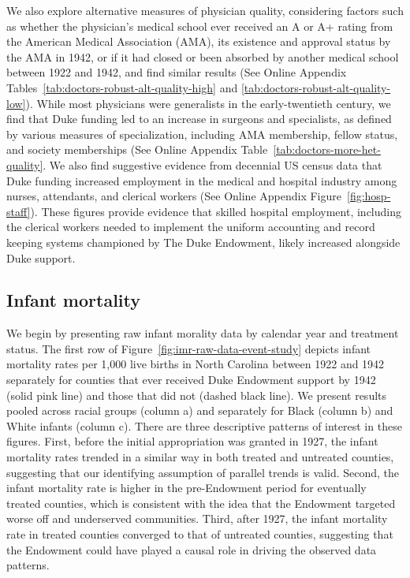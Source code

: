 \documentclass[12pt]{article}
\begin{document}
We also explore alternative measures of physician quality, considering factors such as whether the physician's medical school ever received an A or A+ rating from the American Medical Association (AMA), its existence and approval status by the AMA in 1942, or if it had closed or been absorbed by another medical school between 1922 and 1942, and find similar results (See Online Appendix Tables~\ref{tab:doctors-robust-alt-quality-high} and \ref{tab:doctors-robust-alt-quality-low}). 
While most physicians were generalists in the early-twentieth century, we find that Duke funding led to an increase in surgeons and specialists, as defined by various measures of specialization, including AMA membership, fellow status, and society memberships (See Online Appendix Table~\ref{tab:doctors-more-het-quality}. 
We also find suggestive evidence from decennial US census data that Duke funding increased employment in the medical and hospital industry among nurses, attendants, and clerical workers (See Online Appendix Figure~\ref{fig:hosp-staff}). 
These figures provide evidence that skilled hospital employment, including the clerical workers needed to implement the uniform accounting and record keeping systems championed by The Duke Endowment, likely increased alongside Duke support.


\subsection{Infant mortality}\label{subsec:infant-mortality}

We begin by presenting raw infant morality data by calendar year and treatment status. 
The first row of Figure~\ref{fig:imr-raw-data-event-study} depicts infant mortality rates per 1,000 live births in North Carolina between 1922 and 1942 separately for counties that ever received Duke Endowment support by 1942 (solid pink line) and those that did not (dashed black line). 
We present results pooled across racial groups (column a) and separately for Black (column b) and White infants (column c). 
There are three descriptive patterns of interest in these figures.
First, before the initial appropriation was granted in 1927, the infant mortality rates trended in a similar way in both treated and untreated counties, suggesting that our identifying assumption of parallel trends is valid.
Second, the infant mortality rate is higher in the pre-Endowment period for eventually treated counties, which is consistent with the idea that the Endowment targeted worse off and underserved communities.
Third, after 1927, the infant mortality rate in treated counties converged to that of untreated counties, suggesting that the Endowment could have played a causal role in driving the observed data patterns.
\end{document}
